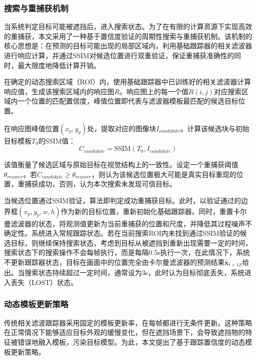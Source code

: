 \subsubsection{搜索与重捕获机制}
当系统判定目标可能被遮挡后，进入搜索状态。为了在有限的计算资源下实现高效的重捕获，本文采用了一种基于置信度验证的周期性搜索与重捕获机制。该机制的核心思想是：在预测的目标可能出现的局部区域内，利用基础跟踪器的相关滤波器进行响应计算，并通过SSIM对候选位置进行双重验证，保证重捕获准确性的同时，最大限度地降低计算开销。

在确定的动态搜索区域（ROI）内，使用基础跟踪器中已训练好的相关滤波器计算响应值，生成该搜索区域内的响应图$R$。响应图上的每一个值$R(i, j)$对应搜索区域内一个位置的匹配置信度，峰值位置即代表与滤波器模板最匹配的候选目标位置。

在响应图峰值位置$(x_p, y_p)$处，提取对应的图像块$I_{candidate}$。计算该候选块与初始目标模板$T_0$的SSIM值：
\begin{equation}
C_{candidate} = \text{SSIM}(T_0, I_{candidate})
\end{equation}

该值衡量了候选区域与原始目标在视觉结构上的一致性。设定一个重捕获阈值$\theta_{recover}$。若$C_{candidate} \geq \theta_{recover}$，则认为该候选位置极大可能是真实目标重现的位置，重捕获成功，否则，认为本次搜索未发现可信目标。

当候选位置通过SSIM验证，算法即判定成功重捕获目标。此时，以验证通过的边界框$(x_p, y_p, w, h)$作为新的目标位置，重新初始化基础跟踪器。同时，重置卡尔曼滤波器的状态，将观测值更新为当前重捕获的位置和尺度，并降低其过程噪声不确定性。系统进入常规跟踪状态。若在当前搜索ROI内未找到通过SSIM验证的候选目标，则继续保持搜索状态，考虑到目标从被遮挡到重新出现需要一定的时间，搜索状态下的搜索操作不会每帧执行，而是每隔0.5s执行一次，在此情况下，系统不更新跟踪器状态，目标在画面中的位置完全由卡尔曼滤波器的预测结果$\hat{\mathbf{x}}_{t+1|t}$给出。当搜索状态持续超过一定时间，通常设为3s，此时认为目标彻底丢失，系统进入丢失（LOST）状态。

\subsubsection{动态模板更新策略}

传统相关滤波跟踪器采用固定的模板更新率，在每帧都进行无条件更新。这种策略在正常情况下能够适应目标外观的缓慢变化，但在遮挡场景下，会导致遮挡物的特征被错误地融入模板，污染目标模型。为此，本文提出了基于跟踪置信度的动态模板更新策略。

